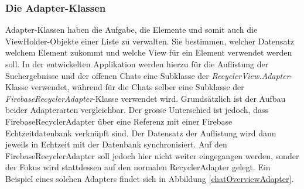 \documentclass[../main.tex]{subfiles}
\begin{document}
	
	\subsubsection{Die Adapter-Klassen}
	Adapter-Klassen haben die Aufgabe, die Elemente und somit auch die ViewHolder-Objekte einer Liste zu verwalten. Sie bestimmen, welcher Datensatz welchem Element zukommt und welche View für ein Element verwendet werden soll. In der entwickelten Applikation werden hierzu für die Auflistung der Suchergebnisse und der offenen Chats eine Subklasse der \emph{RecyclerView.Adapter}-Klasse verwendet, während für die Chats selber eine Subklasse der \emph{FirebaseRecyclerAdapter}-Klasse verwendet wird. Grundsätzlich ist der Aufbau beider Adapterarten vergleichbar. Der grosse Unterschied ist jedoch, dass FirebaseRecyclerAdapter über eine Referenz mit einer Firebase Echtzeitdatenbank verknüpft sind. Der Datensatz der Auflistung wird dann jeweils in Echtzeit mit der Datenbank synchronisiert. Auf den FirebaseRecyclerAdapter soll jedoch hier nicht weiter eingegangen werden, sonder der Fokus wird stattdessen auf den normalen RecyclerAdapter gelegt. Ein Beispiel eines solchen Adapters findet sich in Abbildung \ref{chatOverviewAdapter}.
	
\end{document}

